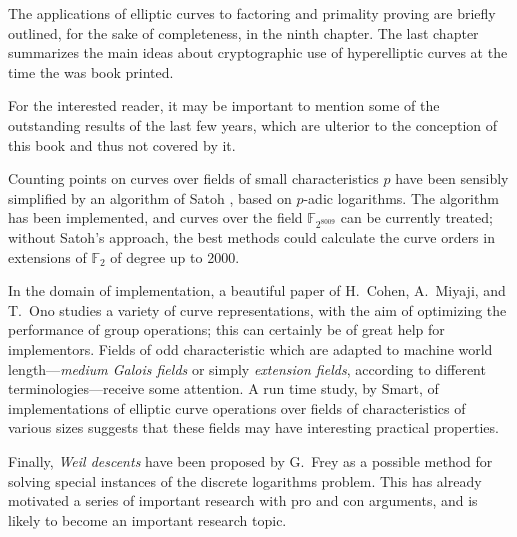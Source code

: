 \documentclass[final]{mcom-l}
\begin{document}
The applications of elliptic curves to factoring and primality proving are
briefly outlined, for the sake of completeness, in the ninth chapter.  The last
chapter summarizes the main ideas about cryptographic use of hyperelliptic
curves at the time the was book printed.

For the interested reader, it may be important to mention some of the
outstanding results of the last few years, which are ulterior to the conception
of this book and thus not covered by it.

Counting points on curves over fields of small characteristics $p$ have been
sensibly simplified by an algorithm of Satoh \cite{9}, based on $p$-adic logarithms.
The algorithm has been implemented, and curves over the field
$\mathbb{F}_{2^{8009}}$ can be currently treated; without Satoh's approach, the
best methods could calculate the curve orders in extensions of $\mathbb{F}_2$
of degree up to 2000.

In the domain of implementation, a beautiful paper of H.~Cohen, A.~Miyaji, and
T.~Ono \cite{2} studies a variety of curve representations, with the aim of
optimizing the performance of group operations; this can certainly be of great
help for implementors.  Fields of odd characteristic which are  adapted to machine
world length---\emph{medium Galois fields} or simply \emph{extension fields},
according to different terminologies---receive some attention.  A run time
study, \cite{12} by Smart, of implementations of elliptic curve operations over
fields of characteristics of various sizes suggests that these fields may have
interesting practical properties.

Finally, \emph{Weil descents} have been proposed by G.~Frey \cite{4} as a
possible method for solving special instances of the discrete logarithms
problem.  This has already motivated a series of important research with pro
and con arguments, and is likely to become an important research topic.
\end{document}
